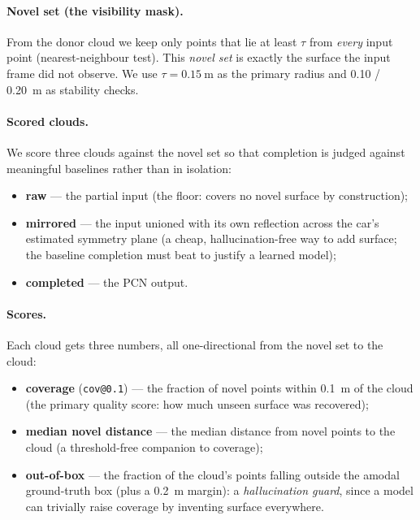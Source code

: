 \paragraph{Novel set (the visibility mask).} From the donor cloud we keep only
points that lie at least $\tau$ from \emph{every} input point (nearest-neighbour
test). This \emph{novel set} is exactly the surface the input frame did not
observe. We use $\tau = \SI{0.15}{\meter}$ as the primary radius and
\SI{0.10}{} / \SI{0.20}{\meter} as stability checks.

\paragraph{Scored clouds.} We score three clouds against the novel set so that
completion is judged against meaningful baselines rather than in isolation:
\begin{itemize}
  \item \textbf{raw} --- the partial input (the floor: covers no novel surface
    by construction);
  \item \textbf{mirrored} --- the input unioned with its own reflection across
    the car's estimated symmetry plane (a cheap, hallucination-free way to add
    surface; the baseline completion must beat to justify a learned model);
  \item \textbf{completed} --- the PCN output.
\end{itemize}

\paragraph{Scores.} Each cloud gets three numbers, all one-directional from the
novel set to the cloud:
\begin{itemize}
  \item \textbf{coverage} (\texttt{cov@0.1}) --- the fraction of novel points
    within \SI{0.1}{\meter} of the cloud (the primary quality score: how much
    unseen surface was recovered);
  \item \textbf{median novel distance} --- the median distance from novel points
    to the cloud (a threshold-free companion to coverage);
  \item \textbf{out-of-box} --- the fraction of the cloud's points falling
    outside the amodal ground-truth box (plus a \SI{0.2}{\meter} margin): a
    \emph{hallucination guard}, since a model can trivially raise coverage by
    inventing surface everywhere.
\end{itemize}

